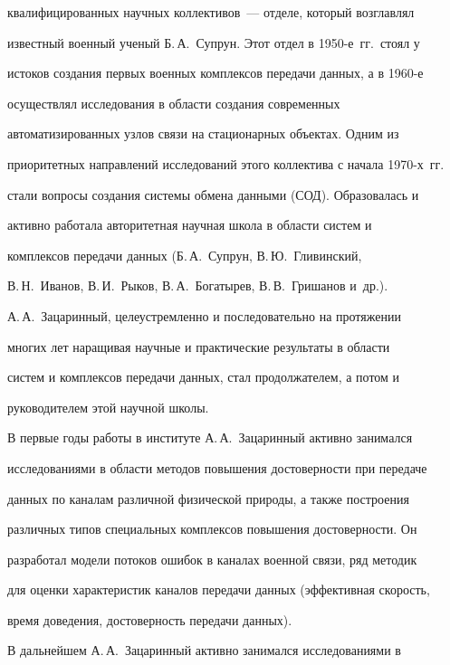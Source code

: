 квалифицированных научных коллективов~--- отделе, который возглавлял 


известный военный ученый Б.\,А.~Супрун. Этот отдел в 1950-е~гг.\ стоял у 


истоков создания первых военных комплексов передачи данных, а в 1960-е  


осуществлял исследования в области создания современных 


автоматизированных узлов связи на стационарных объектах. Одним из 


приоритетных направлений исследований этого коллектива с начала 1970-х~гг.\ 


стали вопросы создания сис\-те\-мы обмена данными (СОД). Образовалась и 


активно работала авторитетная научная школа в об\-ласти сис\-тем и 


комплексов передачи данных (Б.\,А.~Супрун, В.\,Ю.~Гливинский, 


В.\,Н.~Иванов, В.\,И.~Рыков, В.\,А.~Богатырев, В.\,В.~Гришанов и~др.).





А.\,А.~Зацаринный, целеустремленно и последовательно на протяжении 


многих лет наращивая научные и практические результаты в области 


сис\-тем и комплексов передачи данных, стал продолжателем, а потом и 


руководителем этой научной школы.





В первые годы работы в институте А.\,А.~Зацаринный активно занимался 


исследованиями в области методов повышения достоверности при передаче 


данных по каналам различной физической природы, а также построения 


различных типов специальных комплексов повышения достоверности. Он 


разработал модели потоков ошибок в каналах военной связи, ряд методик 


для оценки характеристик каналов передачи данных (эффективная скорость, 


время доведения, достоверность передачи данных).





В дальнейшем А.\,А.~Зацаринный активно занимался исследованиями в 


